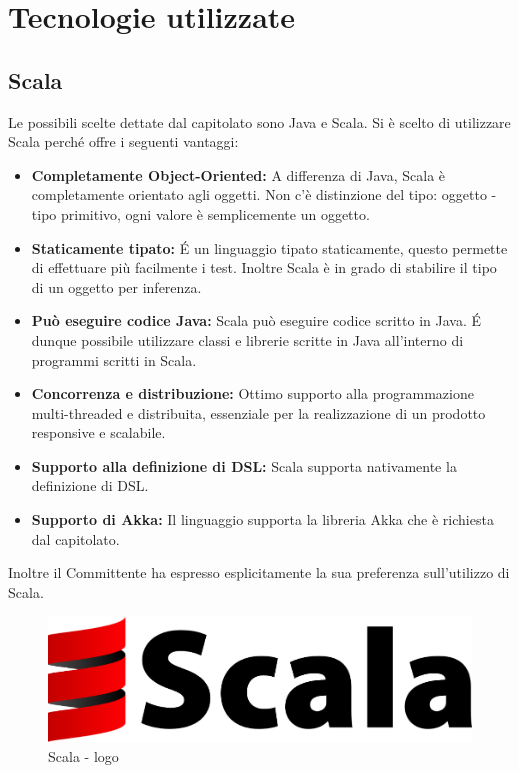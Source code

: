 \documentclass[a4paper]{article}
\begin{document}
		
	\newpage 
	\section{Tecnologie utilizzate}
	\subsection{Scala}
		Le possibili scelte dettate dal capitolato sono Java e Scala. Si è scelto di utilizzare Scala perché offre i seguenti vantaggi:
		\begin{itemize}
            \item \textbf{Completamente Object-Oriented:} A differenza di Java, Scala è completamente orientato agli oggetti. Non c'è distinzione del tipo: oggetto - tipo primitivo, ogni valore è semplicemente un oggetto.
			\item \textbf{Staticamente tipato:} \'E un linguaggio tipato staticamente, questo permette di effettuare più facilmente i test. Inoltre Scala è in grado di stabilire il tipo di un oggetto per inferenza.
            \item \textbf{Può eseguire codice Java:} Scala può eseguire codice scritto in Java. \'E dunque possibile utilizzare classi e librerie scritte in Java all'interno di programmi scritti in Scala. 
            \item \textbf{Concorrenza e distribuzione:} Ottimo supporto alla programmazione multi-threaded e distribuita, essenziale per la realizzazione di un prodotto responsive e scalabile.
			\item \textbf{Supporto alla definizione di DSL:} Scala supporta nativamente la definizione di DSL.
            \item \textbf{Supporto di Akka:} Il linguaggio supporta la libreria Akka che è richiesta dal capitolato.
		\end{itemize}
		Inoltre il Committente ha espresso esplicitamente la sua preferenza sull'utilizzo di Scala.
		\begin{figure} [H]
			\centering
			\includegraphics[scale=0.15]{immagini/ST/scala.png}
			\caption{Scala - logo}
		\end{figure}	
\end{document}
